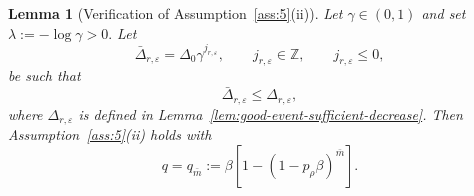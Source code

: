 \documentclass[11pt,a4paper]{article}
\newtheorem{lemma}{Lemma}[section]
\newenvironment{proof}[1][Proof]{%
  \par\noindent\textbf{#1.}\ %
}{%
  \par\vspace{-0.5 ex}            %
  \noindent\hfill\rule{0.5em}{0.5em}\par
  \vspace{1ex}
}
\newcommand{\goldelta}{r}
\begin{document}

\begin{lemma}[Verification of Assumption~\ref{ass:5}(ii)]
\label{lem:assumption-ii-holds}
Let \(\gamma\in(0,1)\) and set
$ \lambda:=-\log\gamma>0.$
Let
\[
    \bar\Delta_{\goldelta,\varepsilon}
    =
    \Delta_0\gamma^{j_{\goldelta,\varepsilon}},
    \qquad
    j_{\goldelta,\varepsilon}\in\mathbb Z,\qquad j_{r,\varepsilon} \leq 0,
\]
be such that
\[
    \bar\Delta_{\goldelta,\varepsilon}
    \le
    \Delta_{\goldelta,\varepsilon},
\]
where \(\Delta_{\goldelta,\varepsilon}\) is defined in
Lemma~\ref{lem:good-event-sufficient-decrease}. Then Assumption~\ref{ass:5}(ii) holds with
\[
    q=q_{\bar{m}}
    :=
    \beta\left[1-(1-p_\rho\beta)^{\bar{m}}\right].
\]
\end{lemma}
\end{document}
